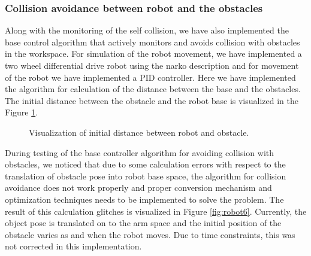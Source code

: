 \documentclass[a4paper, 11.5pt, conference]{ieeeconf}      %
\begin{document}
\subsubsection{Collision avoidance between robot and the obstacles}
Along with the monitoring of the self collision, we have also implemented the base control algorithm that actively monitors and avoids collision with obstacles in the workspace. For simulation of the robot movement, we have implemented a two wheel differential drive robot using the narko description and for movement of the robot we have implemented a PID controller. Here we have implemented the algorithm for calculation of the distance between the base and the obstacles. The initial distance between the obstacle and the robot base is visualized in the Figure \ref{fig:robot5}.

\begin{figure}[H]
	\centering
	\caption{Visualization of initial distance between robot and obstacle.}
	\label{fig:robot5}
\end{figure}

During testing of the base controller algorithm for avoiding collision with obstacles, we noticed that due to some calculation errors with respect to the translation of obstacle pose into robot base space, the algorithm for collision avoidance does not work properly and proper conversion mechanism and optimization techniques needs to be implemented to solve the problem. The result of this calculation glitches is visualized in Figure \ref{fig:robot6}. Currently, the object pose is translated on to the arm space and the initial position of the obstacle varies as and when the robot moves. Due to time constraints, this was not corrected in this implementation.
\end{document}
